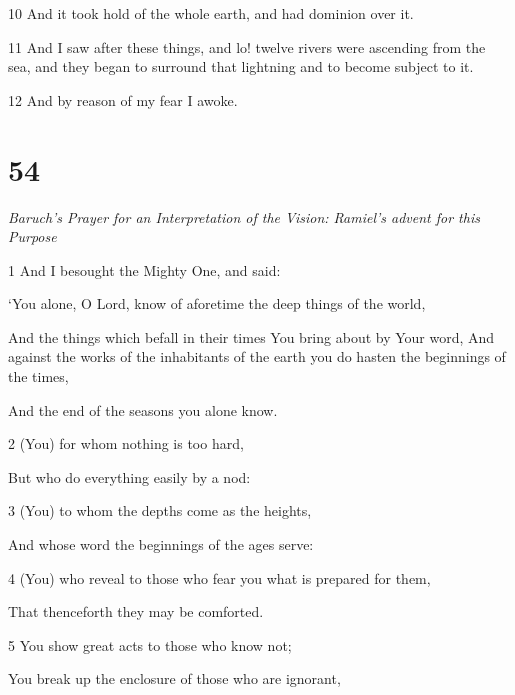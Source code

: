 \par 10 And it took hold of the whole earth, and had dominion over it. 

\par 11 And I saw after these things, and lo! twelve rivers were ascending from the sea, and they began to surround that lightning and to become subject to it. 

\par 12 And by reason of my fear I awoke.

\chapter{54}

\par \textit{Baruch's Prayer for an Interpretation of the Vision: Ramiel's advent for this Purpose}


\par 1 And I besought the Mighty One, and said:

\par ‘You alone, O Lord, know of aforetime the deep things of the world,

\par And the things which befall in their times You bring about by Your word, And against the works of the inhabitants of the earth you do hasten the beginnings of the times,

\par And the end of the seasons you alone know.

\par 2 (You) for whom nothing is too hard,

\par But who do everything easily by a nod:

\par 3 (You) to whom the depths come as the heights,

\par And whose word the beginnings of the ages serve:

\par 4 (You) who reveal to those who fear you what is prepared for them,

\par That thenceforth they may be comforted.

\par 5 You show great acts to those who know not;

\par You break up the enclosure of those who are ignorant,

